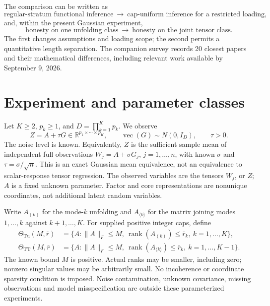 \documentclass[11pt]{article}
\theoremstyle{remark}
\newcommand{\R}{\mathbb R}
\newcommand{\norm}[1]{\lVert #1\rVert}
\newcommand{\rank}{\operatorname{rank}}
\newcommand{\Tu}{\mathrm{Tu}}
\newcommand{\TT}{\mathrm{TT}}
\begin{document}
The comparison can be written as
\[
 \text{regular-stratum functional inference}
 \ \longrightarrow\ 
 \text{cap-uniform inference for a restricted loading},
\]
and, within the present Gaussian experiment,
\[
 \text{honesty on one unfolding class}
 \ \longrightarrow\
 \text{honesty on the joint tensor class}.
\]
The first changes assumptions and loading scope; the second permits a quantitative length separation. The companion survey records 20 closest papers and their mathematical differences, including relevant work available by September 9, 2026.

\section{Experiment and parameter classes}\label{sec:model}

Let $K\ge2$, $p_k\ge1$, and $D=\prod_{k=1}^K p_k$. We observe
\begin{equation}\label{eq:model}
 Z=A+\tau G\in\R^{p_1\times\cdots\times p_K},\qquad
 \operatorname{vec}(G)\sim N(0,I_D),\qquad \tau>0.
\end{equation}
The noise level is known. Equivalently, $Z$ is the sufficient sample mean of independent full observations $W_j=A+\sigma G_j$, $j=1,\ldots,n$, with known $\sigma$ and $\tau=\sigma/\sqrt n$. This is an exact Gaussian mean equivalence, not an equivalence to scalar-response tensor regression. The observed variables are the tensors $W_j$, or $Z$; $A$ is a fixed unknown parameter. Factor and core representations are nonunique coordinates, not additional latent random variables.

Write $A_{(k)}$ for the mode-$k$ unfolding and $A_{\langle k\rangle}$ for the matrix joining modes $1,\ldots,k$ against $k+1,\ldots,K$. For supplied positive integer caps, define
\begin{align}
 \Theta_{\Tu}(M,\bar r)&=\{A:\norm A_F\le M,\ \rank(A_{(k)})\le\bar r_k,\ k=1,\ldots,K\},\label{eq:tucker}\\
 \Theta_{\TT}(M,\bar r)&=\{A:\norm A_F\le M,\ \rank(A_{\langle k\rangle})\le\bar r_k,\ k=1,\ldots,K-1\}.\label{eq:tt}
\end{align}
The known bound $M$ is positive. Actual ranks may be smaller, including zero; nonzero singular values may be arbitrarily small. No incoherence or coordinate sparsity condition is imposed. Noise contamination, unknown covariance, missing observations and model misspecification are outside these parameterized experiments.
\end{document}
